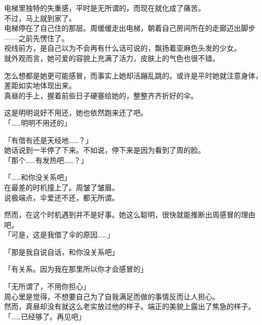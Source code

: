 电梯里独特的失重感，平时是无所谓的，而现在就化成了痛苦。\\

不过，马上就到家了。\\

电梯停在了自己住的那层。周缓缓走出电梯，朝着自己房间所在的走廊迈出脚步——之前先愣住了。\\

视线前方，是自己以为不会再有什么话可说的，飘扬着亚麻色头发的少女。\\

就外观而言，她可爱的容貌上充满了活力，皮肤上的气色也很不错。

怎么想都是她更可能感冒，而事实上她却活蹦乱跳的。或许是平时她就注意身体，差距如实地体现出来。\\

真昼的手上，握着前些日子硬塞给她的，整整齐齐折好的伞。

这是明明说好不用还，她也依然跑来还了吧。\\

「……明明不用还的」

「有借有还是天经地……？」\\

她话说到一半停了下来。不如说，停下来是因为看到了周的脸。\\

「那个……有发热吧……？」

「……和你没关系吧」\\

在最差的时机撞上了。周皱了皱眉。\\

说极端点，伞爱还不还，都无所谓。

然而，在这个时机遇到并不是好事。她这么聪明，很快就能推断出周感冒的理由吧。\\

「可是，这是我借了伞的原因……」

「那是我自说自话，和你没关系吧」

「有关系。因为我在那里所以你才会感冒的」

「无所谓了，不用你担心」\\

周心里是觉得，不想要自己为了自我满足而做的事情反而让人担心。\\

然而，真昼却没有就这么老实放过他的样子。端正的美貌上露出了焦急的样子。\\

「……已经够了。再见吧」\\


